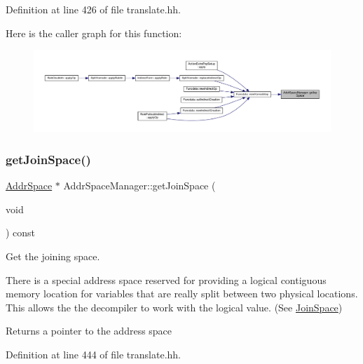 Definition at line 426 of file translate.\+hh.

Here is the caller graph for this function\+:
\nopagebreak
\begin{figure}[H]
\begin{center}
\leavevmode
\includegraphics[width=350pt]{class_addr_space_manager_a2175a095b07fef420632724cacc10354_icgraph}
\end{center}
\end{figure}
\mbox{\label{class_addr_space_manager_addc2a210ade7c84962711a962e27dc32}} 
\subsubsection{\texorpdfstring{getJoinSpace()}{getJoinSpace()}}
{\footnotesize\ttfamily \mbox{\hyperlink{class_addr_space}{Addr\+Space}} $\ast$ Addr\+Space\+Manager\+::get\+Join\+Space (\begin{DoxyParamCaption}\item[{void}]{ }\end{DoxyParamCaption}) const\hspace{0.3cm}{\ttfamily [inline]}}



Get the joining space. 

There is a special address space reserved for providing a logical contiguous memory location for variables that are really split between two physical locations. This allows the the decompiler to work with the logical value. (See \mbox{\hyperlink{class_join_space}{Join\+Space}}) \begin{DoxyReturn}{Returns}
a pointer to the address space 
\end{DoxyReturn}


Definition at line 444 of file translate.\+hh.

\mbox{\label{class_addr_space_manager_abe31b83fccddf3c6d9d35e981f203b19}} 
